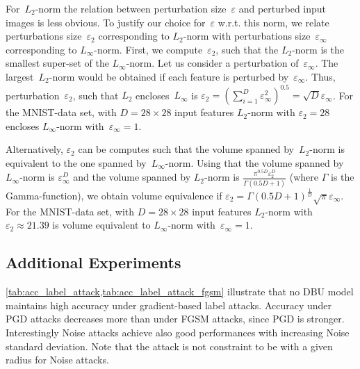 For~$L_2$-norm the relation between perturbation size~$\varepsilon$ and perturbed input images is less obvious. To justify our choice for~$\varepsilon$ w.r.t. this norm, we relate perturbations size~$\varepsilon_2$ corresponding to $L_2$-norm with perturbations size~$\varepsilon_{\infty}$ corresponding to $L_{\infty}$-norm. 
First, we compute~$\varepsilon_2$, such that the $L_2$-norm is the smallest super-set of the $L_{\infty}$-norm. Let us consider a perturbation of~$\varepsilon_{\infty}$. The largest~$L_2$-norm would be obtained if each feature is perturbed by~$\varepsilon_{\infty}$. Thus, perturbation~$\varepsilon_2$, such that $L_2$ encloses~$L_{\infty}$ is $\varepsilon_2 = (\sum_{i=1}^{D} \varepsilon_{\infty}^2)^{0.5} = \sqrt{D} \varepsilon_{\infty}$. For the MNIST-data set, with $D=28 \times 28$ input features $L_2$-norm with $\varepsilon_2=28$ encloses $L_{\infty}$-norm with~$\varepsilon_{\infty}=1$. 

Alternatively, $\varepsilon_2$ can be computes such that the volume spanned by~$L_2$-norm is equivalent to the one spanned by~$L_{\infty}$-norm. Using that the volume spanned by $L_{\infty}$-norm is $\varepsilon_{\infty}^D$ and the volume spanned by $L_2$-norm is 
$\frac{\pi^{0.5 D} \varepsilon_2^D}{\Gamma(0.5 D +1)}$ (where $\Gamma$ is the Gamma-function), we obtain volume equivalence if 
$\varepsilon_2 = \Gamma(0.5 D +1)^{\frac{1}{D}} \sqrt{\pi} \varepsilon_{\infty}$. For the MNIST-data set, with $D=28 \times 28$ input features $L_2$-norm with $\varepsilon_2 \approx 21.39$ is volume equivalent to $L_{\infty}$-norm with~$\varepsilon_{\infty}=1$.











\newpage 
\subsection{Additional Experiments}



\cref{tab:acc_label_attack,tab:acc_label_attack_fgsm} illustrate that no DBU model maintains high accuracy under gradient-based label attacks. Accuracy under PGD attacks decreases more than under FGSM attacks, since PGD is stronger.  Interestingly Noise attacks achieve also good performances with increasing Noise standard deviation. Note that the attack is not constraint to be with a given radius for Noise attacks.



